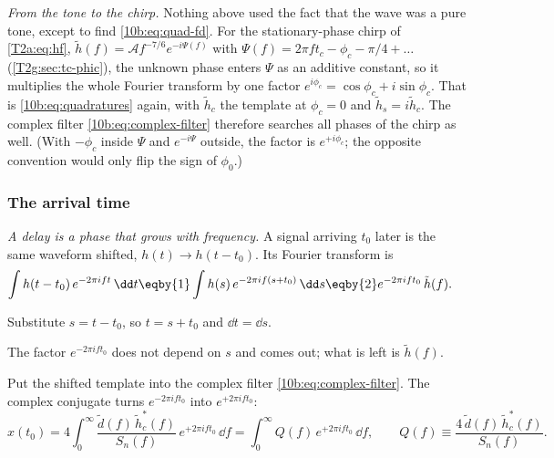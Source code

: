 \emph{From the tone to the chirp.} Nothing above used the fact that the wave was a pure tone, except to find
\eqref{10b:eq:quad-fd}. For the stationary-phase chirp of \cref{T2a:eq:hf}, $\tilde h(f)=\mathcal Af^{-7/6}e^{-i\Psi(f)}$ with $\Psi(f)=2\pi ft_c-\phi_c-\pi/4+\dots$ (\cref{T2g:sec:tc-phic}),
the unknown phase enters $\Psi$ as an additive constant, so it multiplies the whole Fourier transform by one factor
$e^{i\phi_c}=\cos\phi_c+i\sin\phi_c$. That is \eqref{10b:eq:quadratures} again, with $\tilde h_c$ the template at
$\phi_c=0$ and $\tilde h_s=i\tilde h_c$. The complex filter \eqref{10b:eq:complex-filter} therefore searches all phases
of the chirp as well. (With $-\phi_c$ inside $\Psi$ and $e^{-i\Psi}$ outside, the factor is $e^{+i\phi_c}$; the opposite convention would only flip the sign of $\phi_0$.)

\subsubsection*{The arrival time}

\emph{A delay is a phase that grows with frequency.} A signal arriving $t_0$ later is the same waveform shifted,
$h(t)\to h(t-t_0)$. Its Fourier transform is
\begin{align}
  \int h(t-t_0)\,e^{-2\pi ift}\,\dd t
  &\eqby{1}\int h(s)\,e^{-2\pi if(s+t_0)}\,\dd s
   \eqby{2}e^{-2\pi ift_0}\,\tilde h(f).
  \label{10b:eq:shift}
\end{align}
\begin{explain}
  \item Substitute $s=t-t_0$, so $t=s+t_0$ and $\dd t=\dd s$.
  \item The factor $e^{-2\pi ift_0}$ does not depend on $s$ and comes out; what is left is $\tilde h(f)$.
\end{explain}
Put the shifted template into the complex filter \eqref{10b:eq:complex-filter}. The complex conjugate turns
$e^{-2\pi ift_0}$ into $e^{+2\pi ift_0}$:
\begin{equation}
  x(t_0)=4\int_0^\infty\frac{\tilde d(f)\,\tilde h_c^*(f)}{S_n(f)}\,e^{+2\pi ift_0}\,\dd f
        =\int_0^\infty Q(f)\,e^{+2\pi ift_0}\,\dd f,
  \qquad Q(f)\equiv\frac{4\,\tilde d(f)\,\tilde h_c^*(f)}{S_n(f)} .
  \label{10b:eq:filter-t0}
\end{equation}


